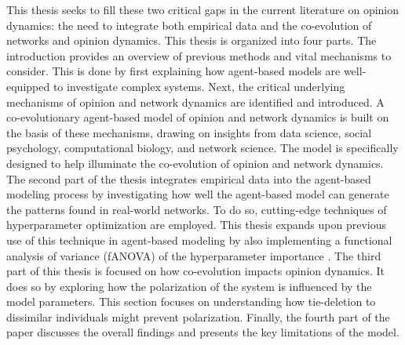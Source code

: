 \documentclass[11pt]{article}
\begin{document}
\noindent This thesis seeks to fill these two critical gaps in the current literature on opinion dynamics: the need to integrate both empirical data and the co-evolution of networks and opinion dynamics. This thesis is organized into four parts. The introduction provides an overview of previous methods and vital mechanisms to consider. This is done by first explaining how agent-based models are well-equipped to investigate complex systems. Next, the critical underlying mechanisms of opinion and network dynamics are identified and introduced. A co-evolutionary agent-based model of opinion and network dynamics is built on the basis of these mechanisms, drawing on insights from data science, social psychology, computational biology, and network science. The model is specifically designed to help illuminate the co-evolution of opinion and network dynamics. 
The second part of the thesis integrates empirical data into the agent-based modeling process by investigating how well the agent-based model can generate the patterns found in real-world networks. To do so, cutting-edge techniques of hyperparameter optimization are employed. This thesis expands upon previous use of this technique in agent-based modeling by also implementing a functional analysis of variance (fANOVA) of the hyperparameter importance \cite{hutter2014efficient}. 
The third part of this thesis is focused on how co-evolution impacts opinion dynamics. It does so by exploring how the polarization of the system is influenced by the model parameters. This section focuses on understanding how tie-deletion to dissimilar individuals might prevent polarization. 
Finally, the fourth part of the paper discusses the overall findings and presents the key limitations of the model. 
\end{document}
